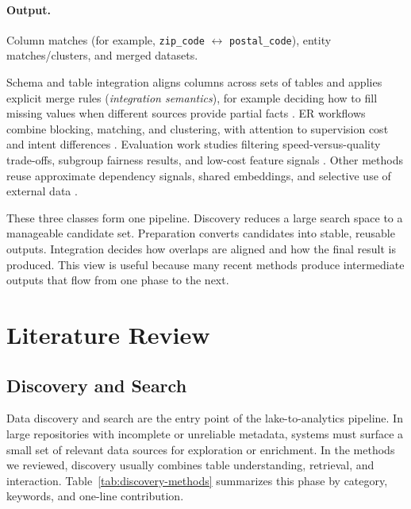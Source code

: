 \documentclass[sigconf,nonacm]{acmart}
\begin{document}
\paragraph{Output.} Column matches (for example, \texttt{zip\_code} $\leftrightarrow$ \texttt{postal\_code}), entity matches/clusters, and merged datasets.

Schema and table integration aligns columns across sets of tables and applies explicit merge rules (\emph{integration semantics}), for example deciding how to fill missing values when different sources provide partial facts \cite{10.1145/3555041.3589732,10.14778/3574245.3574274,10.14778/3742728.3742757,10184612}.
ER workflows combine blocking, matching, and clustering, with attention to supervision cost and intent differences \cite{10.1145/3709715,10.1145/3588722,10.1145/3588712,10.1145/3626711,10.1145/3588938}.
Evaluation work studies filtering speed-versus-quality trade-offs, subgroup fairness results, and low-cost feature signals \cite{10184692,10.14778/3611479.3611525,11112979,10.14778/3681954.3681987}.
Other methods reuse approximate dependency signals, shared embeddings, and selective use of external data \cite{10.1145/3588929,10184556,10.14778/3611479.3611535,10.14778/3603581.3603602}.

These three classes form one pipeline. Discovery reduces a large search space to a manageable candidate set. Preparation converts candidates into stable, reusable outputs. Integration decides how overlaps are aligned and how the final result is produced. This view is useful because many recent methods produce intermediate outputs that flow from one phase to the next.



\section{Literature Review}

\subsection{Discovery and Search}
Data discovery and search are the entry point of the lake-to-analytics pipeline. In large repositories with incomplete or unreliable metadata, systems must surface a small set of relevant data sources for exploration or enrichment. In the methods we reviewed, discovery usually combines table understanding, retrieval, and interaction. Table~\ref{tab:discovery-methods} summarizes this phase by category, keywords, and one-line contribution.
\end{document}
